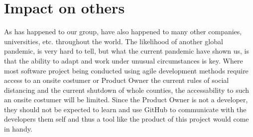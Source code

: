 \section{Impact on others}
As has happened to our group, have also happened to many other companies, universities, etc. throughout the world.
The likelihood of another global pandemic, is very hard to tell, but what the current pandemic have shown us, is that the ability to adapt and work under unusual circumstances is key.
Where most software project being conducted using agile development methods require access to an onsite costumer or Product Owner the current rules of social distancing and the current shutdown of whole counties, the accessability to such an onsite costumer will be limited.
Since the Product Owner is not a developer, they should not be expected to learn and use GitHub to communicate with the developers them self and thus a tool like the product of this project would come in handy.
